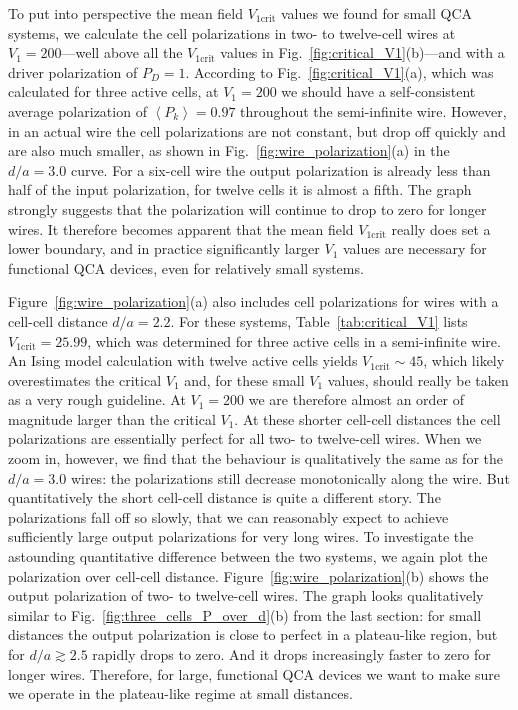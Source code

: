 To put into perspective the mean field $V_{1\textrm{crit}}$ values we found for
small QCA systems, we calculate the cell polarizations in two- to twelve-cell
wires at $V_1 = 200$---well above all the $V_{1\textrm{crit}}$ values in
Fig.~\ref{fig:critical_V1}(b)---and with a driver polarization of $P_D = 1$.
According to Fig.~\ref{fig:critical_V1}(a), which was calculated for three
active cells, at $V_1 = 200$ we should have a self-consistent average
polarization of $\left< P_k \right> = 0.97$ throughout the semi-infinite wire.
However, in an actual wire the cell polarizations are not constant, but drop off
quickly and are also much smaller, as shown in
Fig.~\ref{fig:wire_polarization}(a) in the $d/a = 3.0$ curve. For a six-cell
wire the output polarization is already less than half of the input
polarization, for twelve cells it is almost a fifth. The graph strongly suggests
that the polarization will continue to drop to zero for longer wires.  It
therefore becomes apparent that the mean field $V_{1\textrm{crit}}$ really does
set a lower boundary, and in practice significantly larger $V_1$ values are
necessary for functional QCA devices, even for relatively small systems.

Figure~\ref{fig:wire_polarization}(a) also includes cell polarizations for wires
with a cell-cell distance $d/a = 2.2$. For these systems,
Table~\ref{tab:critical_V1} lists $V_{1\textrm{crit}} = 25.99$, which was determined for
three active cells in a semi-infinite wire. An Ising model calculation with
twelve active cells yields $V_{1\textrm{crit}} \sim 45$, which likely overestimates the
critical $V_1$ and, for these small $V_1$ values, should really be taken as a
very rough guideline. At $V_1 = 200$ we are therefore almost an order of
magnitude larger than the critical $V_1$. At these shorter cell-cell distances
the cell polarizations are essentially perfect for all two- to twelve-cell
wires. When we zoom in, however, we find that the behaviour is qualitatively the
same as for the $d/a = 3.0$ wires: the polarizations still decrease
monotonically along the wire. But quantitatively the short cell-cell distance is
quite a different story. The polarizations fall off so slowly, that we can
reasonably expect to achieve sufficiently large output polarizations for very
long wires. To investigate the astounding quantitative difference between the
two systems, we again plot the polarization over cell-cell distance.
Figure~\ref{fig:wire_polarization}(b) shows the output polarization of two- to
twelve-cell wires. The graph looks qualitatively similar to
Fig.~\ref{fig:three_cells_P_over_d}(b) from the last section: for small
distances the output polarization is close to perfect in a plateau-like region,
but for $d/a \gtrsim 2.5$ rapidly drops to zero. And it drops increasingly
faster to zero for longer wires. Therefore, for large, functional QCA devices we
want to make sure we operate in the plateau-like regime at small distances.


